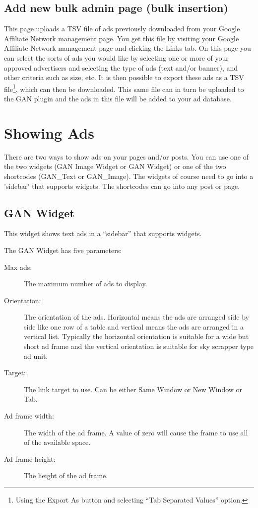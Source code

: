 \documentclass[letterpaper]{article}
\begin{document}
\subsection{Add new bulk admin page (bulk insertion)}
\label{sect:addbulk}

This page uploads a TSV file of ads previously downloaded from your
Google Affiliate Network management page. You get this file by visiting
your Google Affiliate Network management page and clicking the Links
tab. On this page you can select the sorts of ads you would like by
selecting one or more of your approved advertisers and selecting the
type of ads (text and/or banner), and other criteria such as size, etc.
It is then possible to export these ads as a TSV file\footnote{Using
the Export As button and selecting ``Tab Separated Values'' option.},
which can then be downloaded. This same file can in turn be uploaded to
the GAN plugin and the ads in this file will be added to your ad
database.

\section{Showing Ads}

There are two ways to show ads on your pages and/or posts.  You can
use one of the two widgets (GAN Image Widget or GAN Widget) or one of
the two shortcodes (GAN\_Text or GAN\_Image).  The widgets of course need
to go into a 'sidebar' that supports widgets.  The shortcodes can go
into any post or page.

\subsection{GAN Widget}

This widget shows text ads in a ``sidebar'' that supports widgets.

The GAN Widget has five parameters:
\begin{description}
  \item[Max ads:] The maximum number of ads to display.
  \item[Orientation:] The orientation of the ads. Horizontal
means the ads are arranged side by side like one row of a table and
vertical means the ads are arranged in a vertical list. Typically the
horizontal orientation is suitable for a wide but short ad frame and the
vertical orientation is suitable for sky scrapper type ad unit.
  \item[Target:] The link target to use. Can be either Same 
Window or New Window or Tab.
  \item[Ad frame width:] The width of the ad frame. A value
of zero will cause the frame to use all of the available space.
  \item[Ad frame height:] The height of the ad frame.
\end{description}
\end{document}

